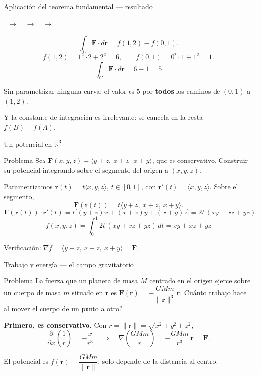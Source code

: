\documentclass[11pt,aspectratio=169]{beamer}
\newcommand{\pottracker}[1]{%
  {\footnotesize\centering
  \pasoitem{1}{1. \textquestiondown{}$M_y=N_x$?}{#1}\ $\rightarrow$\
  \pasoitem{2}{2. Integrar $M$ en $x$}{#1}\ $\rightarrow$\
  \pasoitem{3}{3. Derivar y ajustar}{#1}\ $\rightarrow$\
  \pasoitem{4}{4. Evaluar $f(B)-f(A)$}{#1}\par}
  \vspace{4pt}
}
\begin{document}
\begin{frame}{Aplicación del teorema fundamental --- resultado}
  \pottracker{4}
  \[
    \int_C \mathbf F\cdot d\mathbf r = f(1,2)-f(0,1).
  \]
  \pause
  \[
    f(1,2) = 1^2\cdot 2 + 2^2 = 6,
    \qquad
    f(0,1) = 0^2\cdot 1 + 1^2 = 1.
  \]
  \pause
  \[
    \boxed{\int_C \mathbf F\cdot d\mathbf r = 6-1 = 5}
  \]
  \pause
  \vspace{4pt}
  \begin{center}
  \normalsize\color{tealx} Sin parametrizar ninguna curva: el valor es $5$ por \textbf{todos} los caminos de $(0,1)$ a $(1,2)$.
  \end{center}
  \pause
  \begin{center}\small\color{gray60}
  Y la constante de integración es irrelevante: se cancela en la resta $f(B)-f(A)$.
  \end{center}
\end{frame}

\begin{frame}{Un potencial en $\mathbb R^3$}
  \begin{block}{Problema}
    Sea $\mathbf F(x,y,z)=\langle y+z,\ x+z,\ x+y\rangle$, que es conservativo. Construir su potencial integrando sobre el segmento del origen a $(x,y,z)$.
  \end{block}
  \pause
  Parametrizamos $\mathbf r(t)=t\langle x,y,z\rangle$, $t\in[0,1]$, con $\mathbf r'(t)=\langle x,y,z\rangle$. Sobre el segmento,
  \[
    \mathbf F(\mathbf r(t)) = t\langle y+z,\ x+z,\ x+y\rangle.
  \]
  \pause
  \[
    \mathbf F(\mathbf r(t))\cdot\mathbf r'(t)
    = t\bigl[(y+z)x+(x+z)y+(x+y)z\bigr]
    = 2t\,(xy+xz+yz).
  \]
  \pause
  \[
    f(x,y,z)=\int_0^1 2t\,(xy+xz+yz)\,dt = \boxed{xy+xz+yz}
  \]
  \pause
  \begin{center}\small\color{gray60} Verificación: $\nabla f = \langle y+z,\ x+z,\ x+y\rangle = \mathbf F$. \checkmark\end{center}
\end{frame}

\begin{frame}{Trabajo y energía --- el campo gravitatorio}
  \begin{block}{Problema}
    La fuerza que un planeta de masa $M$ centrado en el origen ejerce sobre un cuerpo de masa $m$ situado en $\mathbf r$ es
    $\mathbf F(\mathbf r)=-\dfrac{GMm}{\|\mathbf r\|^{3}}\,\mathbf r$.
    \textquestiondown{}Cuánto trabajo hace al mover el cuerpo de un punto a otro?
  \end{block}
  \pause
  \textbf{Primero, es conservativo.} Con $r=\|\mathbf r\|=\sqrt{x^2+y^2+z^2}$,
  \[
    \frac{\partial}{\partial x}\left(\frac1r\right)=-\frac{x}{r^{3}}
    \quad\Longrightarrow\quad
    \nabla\!\left(\frac{GMm}{r}\right)=-\frac{GMm}{r^{3}}\,\mathbf r=\mathbf F .
  \]
  \pause
  \begin{center}\normalsize\color{tealx} El potencial es $f(\mathbf r)=\dfrac{GMm}{\|\mathbf r\|}$: solo depende de la distancia al centro.\end{center}
\end{frame}
\end{document}
